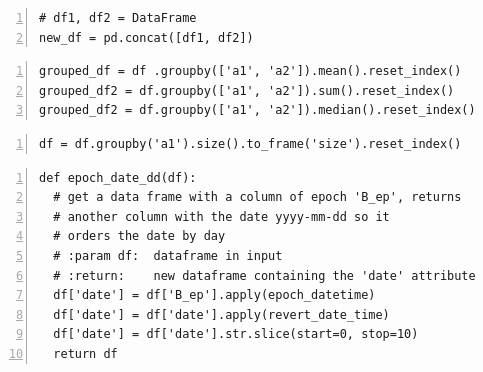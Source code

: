 \documentclass[USenglish]{uit-thesis}
\begin{document}
\begin{appendices}
\begin{lstlisting}[numbers=left,frame=single,caption={Union of df1 and df2 in a new data frame new\_df }]
# df1, df2 = DataFrame
new_df = pd.concat([df1, df2])
\end{lstlisting}


\begin{lstlisting}[numbers=left,frame=single,caption={Group by attributes 'a1' and 'a2'. After that the mean, the sum and the median is calculated on the other attributes. The method reset\_index() returns a data frame with the original attributes before the groupby was applied. }]
grouped_df = df .groupby(['a1', 'a2']).mean().reset_index()
grouped_df2 = df.groupby(['a1', 'a2']).sum().reset_index()
grouped_df2 = df.groupby(['a1', 'a2']).median().reset_index()
\end{lstlisting}


\begin{lstlisting}[numbers=left,frame=single,caption={Count how many occurrences for the attribute 'a1' and save this number in a new attribute called 'size'.}]
df = df.groupby('a1').size().to_frame('size').reset_index()
\end{lstlisting}


\begin{lstlisting}[numbers=left,frame=single,caption={Function for data manipulation. It creates a new column ('date'), from another ('B\_ep') containing the respective $B_{epoch}$ transformed in date time value with days as granularity.}]
def epoch_date_dd(df):
  # get a data frame with a column of epoch 'B_ep', returns
  # another column with the date yyyy-mm-dd so it
  # orders the date by day
  # :param df:  dataframe in input
  # :return:    new dataframe containing the 'date' attribute
  df['date'] = df['B_ep'].apply(epoch_datetime)
  df['date'] = df['date'].apply(revert_date_time)
  df['date'] = df['date'].str.slice(start=0, stop=10)
  return df
\end{lstlisting}



\end{appendices}
\end{document}
